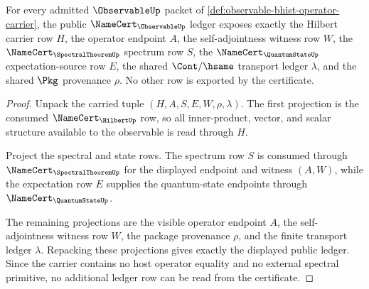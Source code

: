 \begin{theorem}
\label{thm:observable-hilbert-spectral-ledger-exactness}
For every admitted $\ObservableUp$ packet of
\autoref{def:observable-bhist-operator-carrier}, the public
$\NameCert_{\ObservableUp}$ ledger exposes exactly the Hilbert carrier row
$H$, the operator endpoint $A$, the self-adjointness witness row $W$, the
$\NameCert_{\SpectralTheoremUp}$ spectrum row $S$, the
$\NameCert_{\QuantumStateUp}$ expectation-source row $E$, the shared
$\Cont/\hsame$ transport ledger $\lambda$, and the shared $\Pkg$ provenance
$\rho$. No other row is exported by the certificate.
\end{theorem}
\begin{proof}
Unpack the carried tuple
$(H,A,S,E,W,\rho,\lambda)$. The first projection is the consumed
$\NameCert_{\HilbertUp}$ row, so all inner-product, vector, and scalar
structure available to the observable is read through $H$.

Project the spectral and state rows. The spectrum row $S$ is consumed through
$\NameCert_{\SpectralTheoremUp}$ for the displayed endpoint and witness
$(A,W)$, while the expectation row $E$ supplies the quantum-state endpoints
through $\NameCert_{\QuantumStateUp}$.

The remaining projections are the visible operator endpoint $A$, the
self-adjointness witness row $W$, the package provenance $\rho$, and the
finite transport ledger $\lambda$. Repacking these projections gives exactly
the displayed public ledger. Since the carrier contains no host operator
equality and no external spectral primitive, no additional ledger row can be
read from the certificate.
\end{proof}

